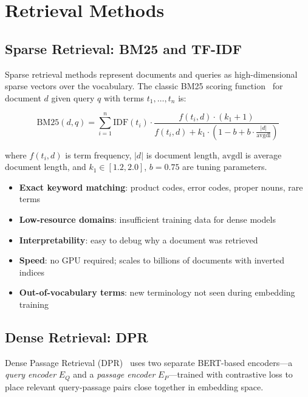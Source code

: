 \section{Retrieval Methods}
\label{retrieval-methods}

\subsection{Sparse Retrieval: BM25 and TF-IDF}
\label{sparse-retrieval-bm25-and-tf-idf}

Sparse retrieval methods represent documents and queries as high-dimensional sparse vectors over the vocabulary. The classic BM25 scoring function~\cite{robertson2009probabilistic} for document $d$ given query $q$ with terms $t_1, \ldots, t_n$ is:

\begin{equation}
  \text{BM25}(d, q) = \sum_{i=1}^{n} \text{IDF}(t_i) \cdot
    \frac{f(t_i, d) \cdot (k_1 + 1)}{f(t_i, d) + k_1 \cdot \left(1 - b + b \cdot \frac{|d|}{\text{avgdl}}\right)}
\end{equation}

where $f(t_i, d)$ is term frequency, $|d|$ is document length, $\text{avgdl}$ is average document length, and $k_1 \in [1.2, 2.0]$, $b = 0.75$ are tuning parameters.

\begin{keybox}
\begin{itemize}
  \item \textbf{Exact keyword matching}: product codes, error codes, proper nouns, rare terms
  \item \textbf{Low-resource domains}: insufficient training data for dense models
  \item \textbf{Interpretability}: easy to debug why a document was retrieved
  \item \textbf{Speed}: no GPU required; scales to billions of documents with inverted indices
  \item \textbf{Out-of-vocabulary terms}: new terminology not seen during embedding training
\end{itemize}
\end{keybox}

\subsection{Dense Retrieval: DPR}
\label{dense-retrieval-dpr}

Dense Passage Retrieval (DPR)~\cite{karpukhin2020dense} uses two separate BERT-based encoders---a \emph{query encoder} $E_Q$ and a \emph{passage encoder} $E_P$---trained with contrastive loss to place relevant query-passage pairs close together in embedding space.

